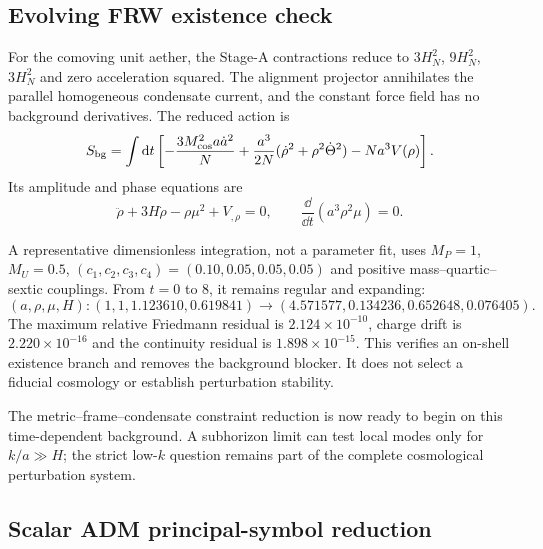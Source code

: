 \subsection{Evolving FRW existence check}

For the comoving unit aether, the Stage-A contractions reduce to
$3H_N^2$, $9H_N^2$, $3H_N^2$ and zero acceleration squared.  The alignment
projector annihilates the parallel homogeneous condensate current, and the
constant force field has no background derivatives.  The reduced action is
\begin{equation}
 S_{\rm bg}=\int\mathrm d t\left[
 -\frac{3M_{\rm cos}^2a\dot a^2}{N}
 +\frac{a^3}{2N}(\dot\rho^2+\rho^2\dot\Theta^2)
 -Na^3V(\rho)\right].
 \label{eq:frw-minisuperspace-action}
\end{equation}
Its amplitude and phase equations are
\begin{equation}
 \ddot\rho+3H\dot\rho-\rho\mu^2+V_{,\rho}=0,
 \qquad
 \frac{\dd}{\dd t}(a^3\rho^2\mu)=0.
 \label{eq:frw-condensate-equations}
\end{equation}

A representative dimensionless integration, not a parameter fit, uses
$M_P=1$, $M_U=0.5$, $(c_1,c_2,c_3,c_4)=(0.10,0.05,0.05,0.05)$ and positive
mass--quartic--sextic couplings.  From $t=0$ to $8$, it remains regular and
expanding:
\begin{equation}
 (a,\rho,\mu,H):
 (1,1,1.123610,0.619841)
 \longrightarrow
 (4.571577,0.134236,0.652648,0.076405).
 \label{eq:frw-existence-endpoints}
\end{equation}
The maximum relative Friedmann residual is $2.124\times10^{-10}$, charge drift
is $2.220\times10^{-16}$ and the continuity residual is
$1.898\times10^{-15}$.  This verifies an on-shell existence branch and removes
the background blocker.  It does not select a fiducial cosmology or establish
perturbation stability.

The metric--frame--condensate constraint reduction is now ready to begin on
this time-dependent background.  A subhorizon limit can test local modes only for
$k/a\gg H$; the strict low-$k$ question remains part of the complete
cosmological perturbation system.

\subsection{Scalar ADM principal-symbol reduction}

